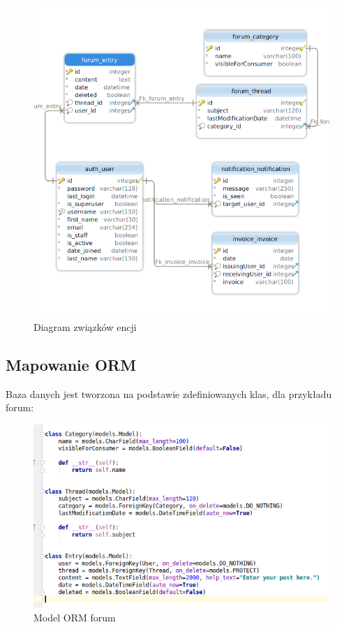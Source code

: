 \documentclass[12pt]{article}
\begin{document}
	\begin{figure}[H]
		\centering
		\includegraphics[scale=0.8]{img/sqlite.png}
		\caption{Diagram związków encji}
		\label{}
	\end{figure}
	
	\subsection{Mapowanie ORM}
	Baza danych jest tworzona na podstawie zdefiniowanych klas, dla przykładu forum:
	\begin{figure}[H]
		\centering
		\includegraphics[scale=0.7]{img/c_forum_model.png}
		\caption{Model ORM forum}
	\end{figure}
	\newpage
\end{document}
